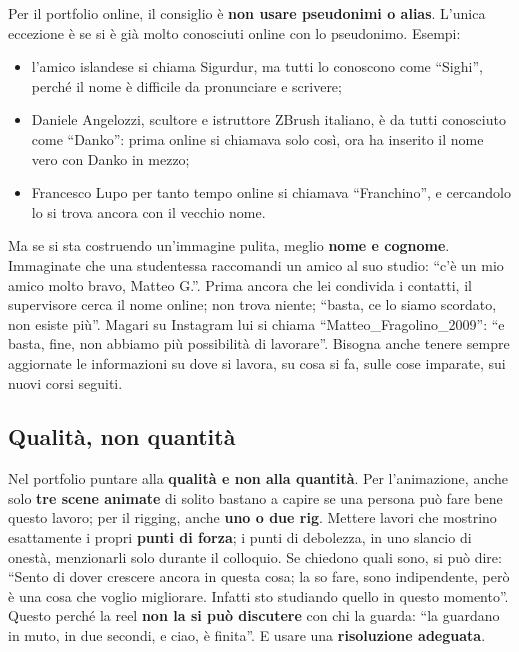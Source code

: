 Per il portfolio online, il consiglio è \textbf{non usare pseudonimi o
alias}. L'unica eccezione è se si è già molto conosciuti online con lo
pseudonimo. Esempi:
\begin{itemize}
  \item l'amico islandese si chiama Sigurdur, ma tutti lo conoscono come
        ``Sighi'', perché il nome è difficile da pronunciare e scrivere;
  \item Daniele Angelozzi, scultore e istruttore ZBrush italiano, è da tutti
        conosciuto come ``Danko'': prima online si chiamava solo così, ora ha
        inserito il nome vero con Danko in mezzo;
  \item Francesco Lupo per tanto tempo online si chiamava ``Franchino'', e
        cercandolo lo si trova ancora con il vecchio nome.
\end{itemize}
Ma se si sta costruendo un'immagine pulita, meglio \textbf{nome e cognome}.
Immaginate che una studentessa raccomandi un amico al suo studio: ``c'è un mio
amico molto bravo, Matteo G.''. Prima ancora che lei condivida i contatti, il
supervisore cerca il nome online; non trova niente; ``basta, ce lo siamo
scordato, non esiste più''. Magari su Instagram lui si chiama
``Matteo\_Fragolino\_2009'': ``e basta, fine, non abbiamo più possibilità di
lavorare''. Bisogna anche tenere sempre aggiornate le informazioni su dove si
lavora, su cosa si fa, sulle cose imparate, sui nuovi corsi seguiti.

\subsection{Qualità, non quantità}

Nel portfolio puntare alla \textbf{qualità e non alla quantità}. Per
l'animazione, anche solo \textbf{tre scene animate} di solito bastano a
capire se una persona può fare bene questo lavoro; per il rigging, anche
\textbf{uno o due rig}. Mettere lavori che mostrino esattamente i propri
\textbf{punti di forza}; i punti di debolezza, in uno slancio di onestà,
menzionarli solo durante il colloquio. Se chiedono quali sono, si può dire:
``Sento di dover crescere ancora in questa cosa; la so fare, sono
indipendente, però è una cosa che voglio migliorare. Infatti sto studiando
quello in questo momento''. Questo perché la reel \textbf{non la si può
discutere} con chi la guarda: ``la guardano in muto, in due secondi, e ciao,
è finita''. E usare una \textbf{risoluzione adeguata}.


